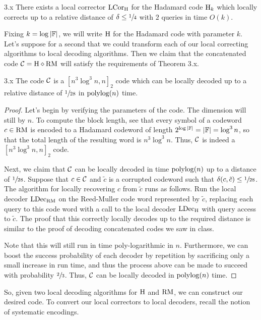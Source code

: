 \documentclass[11pt]{article}
\begin{document}
\begin{claim}{3.x}
    There exists a local corrector ${\textup{LCor}}_{\mathrm{H}}$ for the Hadamard code $\mathrm{H}_k$ which locally corrects up to a relative distance of $\delta \leq \sfrac{1}{4}$ with $2$ queries in time $O(k)$.
\end{claim}

Fixing $k = \log |\mathbb{F}|$, we will write $\mathrm{H}$ for the Hadamard code with parameter $k$. Let's suppose for a second that we could transform each of our local correcting algorithms to local decoding algorithms. Then we claim that the concatenated code $\mathcal{C} = \mathrm{H} \diamond \mathrm{RM}$ will satisfy the requirements of Theorem 3.x.

\begin{claim}{3.x}
    The code $\mathcal{C}$ is a $[n^3\log^3 n, n]_2$ code which can be locally decoded up to a relative distance of $\sfrac{1}{28}$ in $\mathrm{polylog}(n)$ time.
\end{claim}

\begin{proof}
    Let's begin by verifying the parameters of the code. The dimension will still by $n$. To compute the block length, see that every symbol of a codeword $c \in \mathrm{RM}$ is encoded to a Hadamard codeword of length $2^{\log |\mathbb{F}|} = |\mathbb{F}| = \log^3 n$, so that the total length of the resulting word is $n^3 \log^3 n$. Thus, $\mathcal{C}$ is indeed a $[n^3 \log^3 n, n]_2$ code.

    Next, we claim that $\mathcal{C}$ can be locally decoded in time $\mathrm{polylog}(n)$ up to a distance of $\sfrac{1}{28}$. Suppose that $c \in \mathcal{C}$ and $\tilde{c}$ is a corrupted codeword such that $\delta(c, \tilde{c}) \leq \sfrac{1}{28}$. The algorithm for locally recovering $c$ from $\tilde{c}$ runs as follows. Run the local decoder ${\textup{LDec}}_{\mathrm{RM}}$ on the Reed-Muller code word represented by $\tilde{c}$, replacing each query to this code word with a call to the local decoder ${\textup{LDec}}_{\mathrm{H}}$ with query access to $\tilde{c}$. The proof that this correctly locally decodes up to the required distance is similar to the proof of decoding concatenated codes we saw in class.
    
    Note that this will still run in time poly-logarithmic in $n$. Furthermore, we can boost the success probability of each decoder by repetition by sacrificing only a small increase in run time, and thus the process above can be made to succeed with probability $\sfrac{2}{3}$. Thus, $\mathcal{C}$ can be locally decoded in $\mathrm{polylog}(n)$ time.
\end{proof}

So, given two local decoding algorithms for $\mathrm{H}$ and $\mathrm{RM}$, we can construct our desired code. To convert our local correctors to local decoders, recall the notion of systematic encodings.
\end{document}

